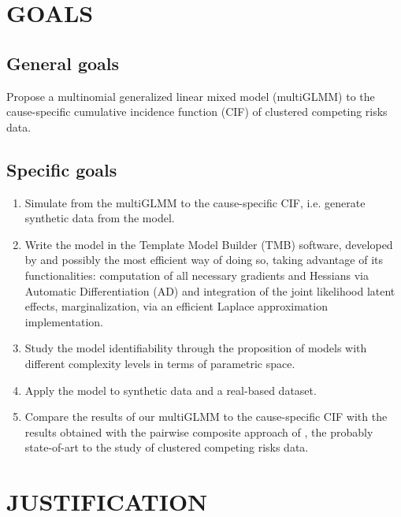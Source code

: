 \section{GOALS}

\subsection{General goals}

Propose a multinomial generalized linear mixed model (multiGLMM) to the
cause-specific cumulative incidence function (CIF) of clustered
competing risks data.

\subsection{Specific goals}

\begin{enumerate}
\item Simulate from the multiGLMM to the cause-specific CIF, i.e.
  generate synthetic data from the model.

\item Write the model in the Template Model Builder (TMB) software,
  developed by  and possibly the most efficient way of
  doing so, taking advantage of its functionalities: computation of all
  necessary gradients and Hessians via Automatic Differentiation (AD)
  and integration of the joint likelihood latent effects,
  marginalization, via an efficient Laplace approximation
  implementation.

\item Study the model identifiability through the proposition of models
  with different complexity levels in terms of parametric space.

\item Apply the model to synthetic data and a real-based dataset.

\item Compare the results of our multiGLMM to the cause-specific CIF
  with the results obtained with the pairwise composite approach of
  , the probably state-of-art to the study of
  clustered competing risks data.
\end{enumerate}

\section{JUSTIFICATION}

